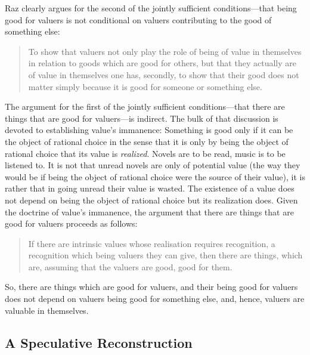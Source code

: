 \documentclass[a4paper,12pt]{article}
\begin{document}
Raz clearly argues for the second of the jointly sufficient conditions---that being good for valuers is not conditional on valuers contributing to the good of something else:
\begin{quote}
	To show that valuers not only play the role of being of value in themselves in relation to goods which are good for others, but that they actually are of value in themselves one has, secondly, to show that their good does not matter simply because it is good for someone or something else. \citep[156]{Raz:2001ps}
\end{quote}

The argument for the first of the jointly sufficient conditions---that there are things that are good for valuers---is indirect. The bulk of that discussion is devoted to establishing value's immanence: Something is good only if it can be the object of rational choice in the sense that it is only by being the object of rational choice that its value is \emph{realized}. Novels are to be read, music is to be listened to. It is not that unread novels are only of potential value (the way they would be if being the object of rational choice were the source of their value), it is rather that in going unread their value is wasted. The existence of a value does not depend on being the object of rational choice but its realization does. Given the doctrine of value's immanence, the argument that there are things that are good for valuers proceeds as follows:
\begin{quote}
	If there are intrinsic values whose realisation requires recognition, a recognition which being valuers they can give, then there are things, which are, assuming that the valuers are good, good for them. \citep[156]{Raz:2001ps}
\end{quote}

So, there are things which are good for valuers, and their being good for valuers does not depend on valuers being good for something else, and, hence, valuers are valuable in themselves.


\subsection{A Speculative Reconstruction}\label{sub:a_speculative_reconstruction} %
\end{document}
